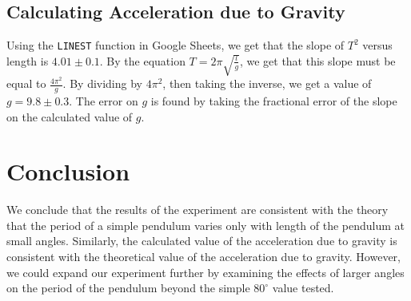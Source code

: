 \documentclass[10pt]{extarticle}
\begin{document}
{\subsection*{Calculating Acceleration due to Gravity}%
Using the \texttt{LINEST} function in Google Sheets, we get that the slope of $T^2$ versus length is $4.01\pm 0.1$. By the equation $T = 2\pi \sqrt{\frac{l}{g}}$, we get that this slope must be equal to $\frac{4\pi^2}{g}$. By dividing by $4\pi^2$, then taking the inverse, we get a value of $g = 9.8\pm 0.3$. The error on $g$ is found by taking the fractional error  of the slope on the calculated value of $g$.
\section*{Conclusion}
We conclude that the results of the experiment are consistent with the theory that the period of a simple pendulum varies only with length of the pendulum at small angles. Similarly, the calculated value of the acceleration due to gravity is consistent with the theoretical value of the acceleration due to gravity. However, we could expand our experiment further by examining the effects of larger angles on the period of the pendulum beyond the simple $80^{\circ}$ value tested.
}
\end{document}
